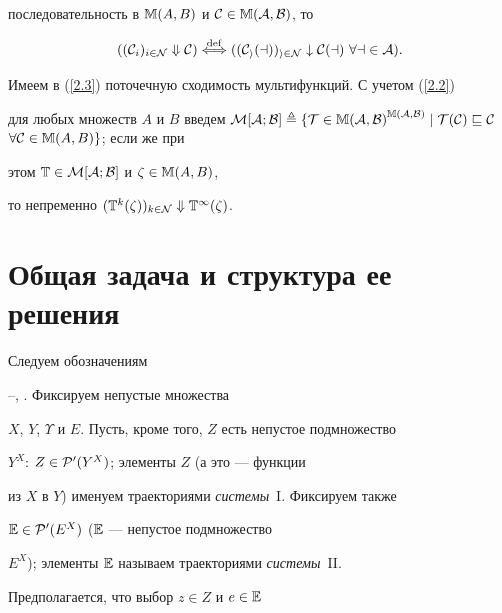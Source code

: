 последовательность в $\Bbb{M}(A,B)$ и $\cal{C} \in


\Bbb{M}(A,B)$, то


\begin{equation}\label{2.3}


({({\cal{C}}_i)_{i \in \cal{N}}} \Dow \cal{C})


\overset{\mathrm{def}}{\Longleftrightarrow}{}


({({\cal{C}_i}(a))_{i \in \cal{N}}} \dow


\cal{C}(a)\ \fo{a} \in A).


\end{equation}


Имеем в (\ref{2.3}) поточечную сходимость мультифункций. С учетом (\ref{2.2})


для любых множеств $A$ и $B$ введем $\cal{M}[A;B] \triangleq \{T \in


{\Bbb{M}(A,B)}^{\Bbb{M}(A,B)} \mid T(\cal{C}) \sqsubseteq


\cal{C}$ $\fo{\cal{C}} \in \Bbb{M}(A,B)\}$; если же при


этом $\Bbb{T} \in \cal{M}[A;B]$ и $\zeta \in \Bbb{M}(A,B)$,


то непременно ${({{\Bbb{T}}^k}(\zeta))_{k \in \cal{N}}} \Dow


{{\Bbb{T}}^\infty}(\zeta)$.








\section{Общая задача и структура ее решения}





Следуем обозначениям


\cite{23}--\cite{26}, \cite{55}. Фиксируем непустые множества


$X$, $Y$, $\Upsilon$ и $E$. Пусть, кроме того, $Z$ есть непустое подмножество


$Y^X$: $Z \in {\cal{P}}'(Y^X)$; элементы $Z$ (а это --- функции


из $X$ в $Y$) именуем траекториями {\it системы}~I. Фиксируем также


$\Bbb{E} \in {\cal{P}}'(E^X)$ ($\Bbb{E}$ --- непустое подмножество


$E^X$); элементы $\Bbb{E}$ называем траекториями {\it системы}~II.


Предполагается, что выбор $z \in Z$ и $e \in \Bbb{E}$


